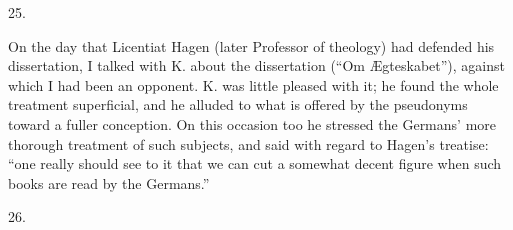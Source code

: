\documentclass[12pt,a4paper,openany]{book}
\newcommand{\secnum}[1]{\par\begin{center}#1\end{center}\par\nobreak}
\begin{document}
\secnum{25.}

On the day that Licentiat Hagen (later Professor of theology) had defended
his dissertation, I talked with K. about the dissertation (``Om
Ægteskabet''), against which I had been an opponent. K. was little pleased
with it; he found the whole treatment superficial, and
he alluded to what is offered by the pseudonyms toward a fuller
conception. On this occasion too he stressed the Germans' more thorough
treatment of such subjects, and said with regard to Hagen's treatise:
``one really should see to it that we can cut a somewhat decent figure
when such books are read by the Germans.''

\secnum{26.}
\end{document}
